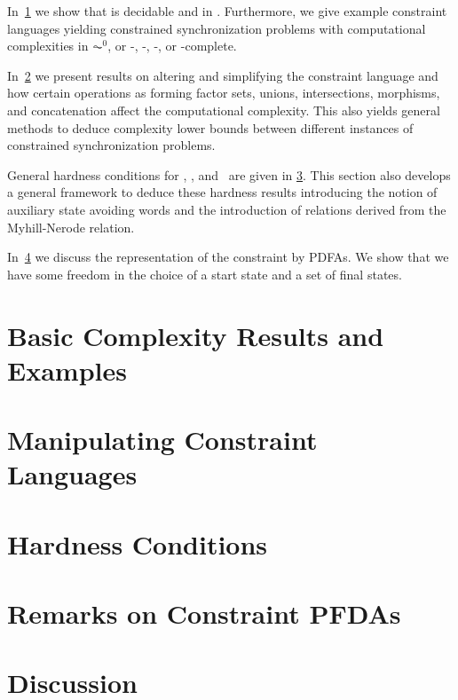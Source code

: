 
In~\cref{constr_sync:sec:prelim_results} we show that  is decidable and in \PSPACE.
Furthermore, we give example constraint languages
yielding constrained synchronization 
problems with computational complexities 
in $\AC^0$, or \LOGSPACE-, \NL-, \NP-, or \PSPACE-complete.

In~\cref{constr_sync:sec:manip} we present results on altering and simplifying 
the constraint language and how certain operations as forming factor sets, unions, intersections, morphisms, and concatenation
affect the computational complexity.
This also yields
general methods to deduce complexity lower bounds between different instances of constrained synchronization problems.

General hardness conditions for \NL, \NP, and \PSPACE\  are given in \cref{constr_sync:sec:hardness}.
This section also develops a general framework to deduce these hardness results introducing
the notion of auxiliary state avoiding words and the introduction of relations derived from the Myhill-Nerode relation.

In~\cref{constr_sync:sec:aut} we discuss the representation of the constraint by PDFAs.
We show that we have some freedom in the choice of a start state and a set of final states.

\section{Basic Complexity Results and Examples}
\label{constr_sync:sec:prelim_results}



\section{Manipulating Constraint Languages}
\label{constr_sync:sec:manip}



\section{Hardness Conditions}
\label{constr_sync:sec:hardness}




\section{Remarks on Constraint PFDAs}
\label{constr_sync:sec:aut}



\section{Discussion}
\label{constr_sync:sec:gen_results:discussion}
	
 